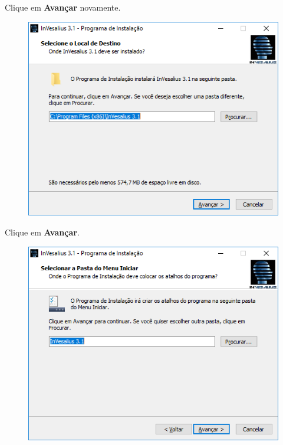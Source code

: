 \hspace{.2cm}

Clique em \textbf{Avançar} novamente. 

\begin{figure}[!htb]  
\centering
\includegraphics[scale=0.7]{../user_guide_figures/invesalius_screen/installation_folder_pt.png}
\end{figure}

\newpage

Clique em \textbf{Avançar}.
\begin{figure}[!htb]
\centering
\includegraphics[scale=0.7]{../user_guide_figures/invesalius_screen/installation_program_name_pt.png}
\end{figure}

